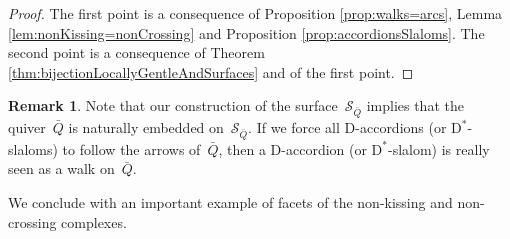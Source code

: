 \documentclass{amsart}
\theoremstyle{definition}
\newtheorem{remark}[theorem]{Remark}
\newcommand{\surface}{\mathcal{S}} %
\newcommand{\dual}{^*} %
\newcommand{\dissection}{\mathrm{D}} %
\begin{document}
\begin{proof}
The first point is a consequence of Proposition \ref{prop:walks=arcs}, Lemma \ref{lem:nonKissing=nonCrossing} and Proposition \ref{prop:accordionsSlaloms}.
The second point is a consequence of Theorem \ref{thm:bijectionLocallyGentleAndSurfaces} and of the first point.
\end{proof}

\begin{remark}
Note that our construction of the surface~$\surface_{\bar Q}$ implies that the quiver~$\bar Q$ is naturally embedded on~$\surface_{\bar Q}$.
If we force all $\dissection$-accordions (or $\dissection\dual$-slaloms) to follow the arrows of~$\bar Q$, then a $\dissection$-accordion (or $\dissection\dual$-slalom) is really seen as a walk on~$\bar Q$.
\end{remark}

We conclude with an important example of facets of the non-kissing and non-crossing complexes.
\end{document}
